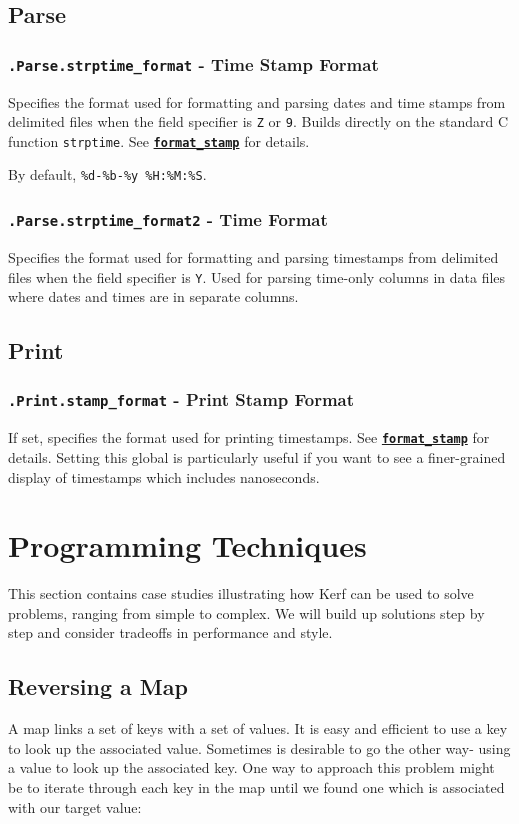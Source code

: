 \documentclass{article}
\newcommand{\primu}[2]{\hyperref[prim:#2]{\textbf{\texttt{#1}}}}
\newcommand{\constdef}[3]{\subsubsection{\texttt{#1} - #2}\label{const:#3}}
\begin{document}
\pagebreak
\subsection{Parse}
\constdef{.Parse.strptime\_format}{Time Stamp Format}{parseStrptimeFormat}

Specifies the format used for formatting and parsing dates and time stamps from delimited files when the field specifier is \texttt{Z} or \texttt{9}. Builds directly on the standard C function \texttt{strptime}. See \primu{format\_stamp}{formatStamp} for details.

\vspace{0.5cm}

By default, \texttt{\%d-\%b-\%y \%H:\%M:\%S}. \\

\constdef{.Parse.strptime\_format2}{Time Format}{parseStrptimeFormat2}
Specifies the format used for formatting and parsing timestamps from delimited files when the field specifier is \texttt{Y}. Used for parsing time-only columns in data files where dates and times are in separate columns. \\

\subsection{Print}
\constdef{.Print.stamp\_format}{Print Stamp Format}{printStampFormat}

If set, specifies the format used for printing timestamps. See \primu{format\_stamp}{formatStamp} for details. Setting this global is particularly useful if you want to see a finer-grained display of timestamps which includes nanoseconds.

\pagebreak
\section {Programming Techniques}
This section contains case studies illustrating how Kerf can be used to solve problems, ranging from simple to complex. We will build up solutions step by step and consider tradeoffs in performance and style.

\subsection {Reversing a Map}
A map links a set of keys with a set of values. It is easy and efficient to use a key to look up the associated value. Sometimes is desirable to go the other way- using a value to look up the associated key. One way to approach this problem might be to iterate through each key in the map until we found one which is associated with our target value:
\end{document}
